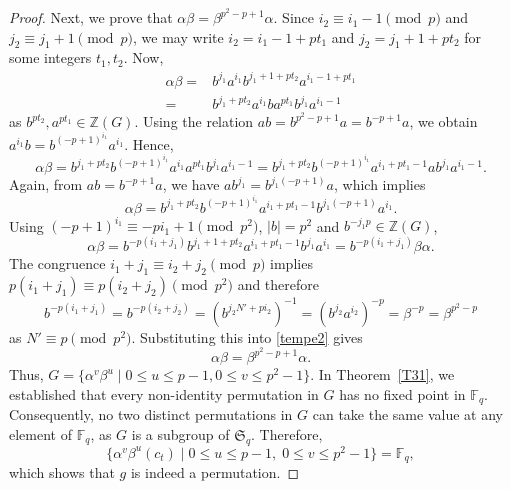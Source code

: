 \documentclass[11pt]{amsart}
\theoremstyle{plain}
\numberwithin{equation}{section}
\begin{document}
\begin{proof}
Next, we prove that $\alpha \beta=\beta^{p^2-p+1}\alpha$. Since $i_2\equiv i_1-1 \pmod  p$ and $j_2 \equiv j_1+1 \pmod  p$, we may write $i_2=i_1-1+pt_1$ and $j_2=j_1+1+pt_2$ for some integers $t_1,t_2$. Now,
  \[
  \begin{aligned}
  \alpha \beta=&b^{j_1}a^{i_1}b^{j_1+1+pt_2}a^{i_1-1+pt_1}
  \\=&b^{j_1+pt_2}a^{i_1}ba^{pt_1}b^{j_1}a^{i_1-1}
    \end{aligned}
  \]
 as $b^{pt_2},a^{pt_1} \in \mathbb{Z}(G)$. Using the relation $ab=b^{p^2-p+1}a=b^{-p+1}a$, we obtain $a^{i_1}b=b^{(-p+1)^{i_1}}a^{i_1}$. Hence, 
 \[
 \alpha \beta=b^{j_1+pt_2}b^{(-p+1)^{i_1}}a^{i_1}a^{pt_1}b^{j_1}a^{i_1-1}=b^{j_1+pt_2}b^{(-p+1)^{i_1}}a^{i_1+pt_1-1}ab^{j_1}a^{i_1-1}.
 \]
 Again, from $ab=b^{-p+1}a$, we have $ab^{j_1}=b^{j_1(-p+1)}a$, which implies 
 \begin{equation*}
     \alpha \beta=b^{j_1+pt_2}b^{(-p+1)^{i_1}}a^{i_1+pt_1-1}b^{j_1(-p+1)}a^{i_1}.
 \end{equation*}
 Using $(-p+1)^{i_1} \equiv -pi_1+1 \pmod {p^2}$, $|b|=p^2$ and $b^{-j_1p} \in \mathbb{Z}(G)$,
\begin{equation}\label{tempe2}
     \alpha \beta=b^{-p(i_1+j_1)}b^{j_1+1+pt_2}a^{i_1+pt_1-1}b^{j_1}a^{i_1}=b^{-p(i_1+j_1)}\beta \alpha.
 \end{equation}
 The congruence  $i_1+j_1 \equiv i_2+j_2 \pmod  p$ implies $p(i_1+j_1) \equiv p(i_2+j_2) \pmod {p^2}$ and therefore $$b^{-p(i_1+j_1)}=b^{-p(i_2+j_2)}=(b^{j_2N'+pi_2})^{-1}=(b^{j_2}a^{i_2})^{-p}=\beta^{-p}=\beta^{p^2-p}$$ as $N'\equiv p \pmod {p^2}$. Substituting this into \eqref{tempe2} gives $$\alpha \beta=\beta^{p^2-p+1}\alpha.$$ Thus, $G=\{\alpha^{v}\beta^{u} \mid 0 \leq u \leq p-1, 0 \leq v \leq p^2-1\}$. In Theorem~\ref{T31}, we established that every non-identity permutation in $G$
has no fixed point in $\mathbb{F}_q$. Consequently, no two distinct
permutations in $G$ can take the same value at any element of $\mathbb{F}_q$,
as $G$ is a subgroup of $\mathfrak{S}_q$. Therefore,
\[
\{\alpha^{v}\beta^{u}(c_t)\mid 0 \le u \le p-1,\; 0 \le v \le p^{2}-1\}
 = \mathbb{F}_q,
\]
which shows that $g$ is indeed a permutation.

 
 

\end{proof}
\end{document}
